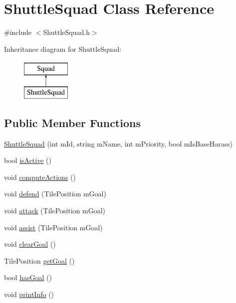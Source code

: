 \hypertarget{class_shuttle_squad}{
\section{ShuttleSquad Class Reference}
\label{class_shuttle_squad}
}


{\ttfamily \#include $<$ShuttleSquad.h$>$}

Inheritance diagram for ShuttleSquad:\begin{figure}[H]
\begin{center}
\leavevmode
\includegraphics[height=2.000000cm]{class_shuttle_squad}
\end{center}
\end{figure}
\subsection*{Public Member Functions}
\begin{DoxyCompactItemize}
\item 
\hyperlink{class_shuttle_squad_a1fe26ca2cbaf14e7d6981f94b2c7a34e}{ShuttleSquad} (int mId, string mName, int mPriority, bool mIsBaseHarass)
\item 
bool \hyperlink{class_shuttle_squad_a7200fe253df2b1e7c239becf1d5936db}{isActive} ()
\item 
void \hyperlink{class_shuttle_squad_a89cff150c53b894c7cfafb99f89027a5}{computeActions} ()
\item 
void \hyperlink{class_shuttle_squad_a0746bffe2a0155ccfd26e8834ce1c516}{defend} (TilePosition mGoal)
\item 
void \hyperlink{class_shuttle_squad_a8e2cb3b333d12671a39cdccf365b2af5}{attack} (TilePosition mGoal)
\item 
void \hyperlink{class_shuttle_squad_a28ccbaa15e04a38638879bb0a17f1186}{assist} (TilePosition mGoal)
\item 
void \hyperlink{class_shuttle_squad_a6017ba95442c3536da97c1c9fb4f68f4}{clearGoal} ()
\item 
TilePosition \hyperlink{class_shuttle_squad_a884fb24e4e9cc394cdec26db7ef0f591}{getGoal} ()
\item 
bool \hyperlink{class_shuttle_squad_abfcd03bfbb68fe3d8820304746083c11}{hasGoal} ()
\item 
void \hyperlink{class_shuttle_squad_a94b9ed957ba9c69fe6da501e8c816568}{printInfo} ()
\end{DoxyCompactItemize}


